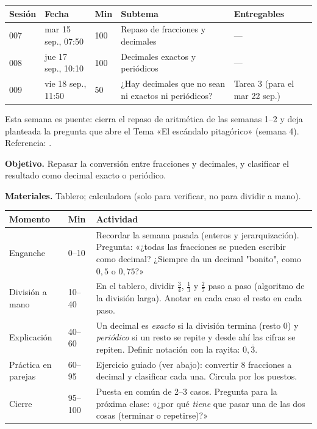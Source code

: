 \documentclass[11pt]{article}
\begin{document}
\encabezado*

\begin{center}
{\renewcommand{\arraystretch}{1.3}
\begin{tabularx}{\linewidth}{@{}l l l X l@{}}
  \toprule
  \textbf{Sesión} & \textbf{Fecha} & \textbf{Min} & \textbf{Subtema} & \textbf{Entregables}\\
  \midrule
  007 & mar 15 sep., 07:50 & 100 & Repaso de fracciones y decimales & —\\
  008 & jue 17 sep., 10:10 & 100 & Decimales exactos y periódicos & —\\
  009 & vie 18 sep., 11:50 & 50  & ¿Hay decimales que no sean ni exactos ni periódicos? & Tarea 3 (para el mar 22 sep.)\\
  \bottomrule
\end{tabularx}}
\end{center}

Esta semana es puente: cierra el repaso de aritmética de las semanas 1–2 y deja planteada
la pregunta que abre el Tema «El escándalo pitagórico» (semana 4).
Referencia: .


\textbf{Objetivo.} Repasar la conversión entre fracciones y decimales, y clasificar el
resultado como decimal exacto o periódico.

\textbf{Materiales.} Tablero; calculadora (solo para verificar, no para dividir a mano).

\begin{center}
{\renewcommand{\arraystretch}{1.3}
\begin{tabularx}{\linewidth}{@{}l l X@{}}
  \toprule
  \textbf{Momento} & \textbf{Min} & \textbf{Actividad}\\
  \midrule
  Enganche & 0–10 & Recordar la semana pasada (enteros y jerarquización). Pregunta:
    «¿todas las fracciones se pueden escribir como decimal? ¿Siempre da un decimal
    "bonito", como $0{,}5$ o $0{,}75$?»\\
  División a mano & 10–40 & En el tablero, dividir $\frac{3}{4}$, $\frac{1}{3}$ y
    $\frac{2}{7}$ paso a paso (algoritmo de la división larga). Anotar en cada caso el
    resto en cada paso.\\
  Explicación & 40–60 & Un decimal es \emph{exacto} si la división termina (resto $0$) y
    \emph{periódico} si un resto se repite y desde ahí las cifras se repiten. Definir
    notación con la rayita: $0{,}\overline{3}$.\\
  Práctica en parejas & 60–95 & Ejercicio guiado (ver abajo): convertir 8 fracciones a
    decimal y clasificar cada una. Circula por los puestos.\\
  Cierre & 95–100 & Puesta en común de 2–3 casos. Pregunta para la próxima clase: «¿por
    qué \emph{tiene} que pasar una de las dos cosas (terminar o repetirse)?»\\
  \bottomrule
\end{tabularx}}
\end{center}
\end{document}
